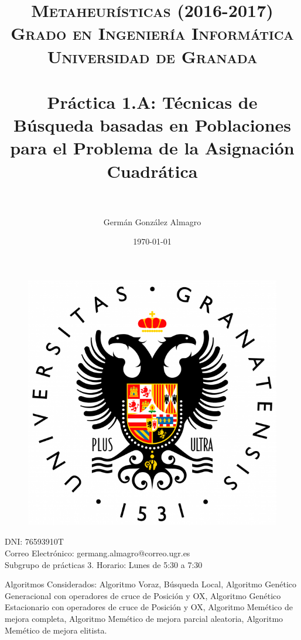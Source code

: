 \documentclass[11pt,a4paper]{article}
\title{
	\normalfont \normalsize 
	\textsc{\textbf{Metaheurísticas (2016-2017)} \\ Grado en Ingeniería Informática \\ Universidad de Granada} \\ [25pt] %
	\horrule{0.5pt} \\[0.4cm] %
	\huge Práctica 1.A: Técnicas de Búsqueda basadas en Poblaciones para el Problema de la Asignación Cuadrática  \\ %
	\horrule{2pt} \\[0.5cm] %
}
\author{Germán González Almagro} %
\begin{document}
	
	\date{\today}
	
	\maketitle
	
	\begin{figure}[!h]
		\centering
		\includegraphics[scale=0.35]{LogoUGR.png} 
	\end{figure}
	
	\noindent DNI: 76593910T\\Correo Electrónico: germang.almagro@correo.ugr.es\\Subgrupo de prácticas 3. Horario: Lunes de 5:30 a 7:30
	
	\vspace{1cm}
	
	\noindent Algoritmos Considerados: Algoritmo Voraz, Búsqueda Local, Algoritmo Genético Generacional con operadores de cruce de Posición y OX, Algoritmo Genético Estacionario con operadores de cruce de Posición y OX, Algoritmo Memético de mejora completa, Algoritmo Memético de mejora parcial aleatoria, Algoritmo Memético de mejora elitista.
	
	
	\newpage
	
	\tableofcontents
	
	\listoffigures
	
	\listoftables
	
\end{document}
